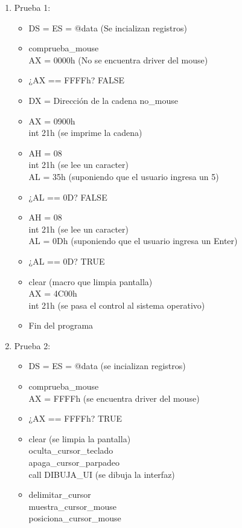 \documentclass[12pt]{article}
\begin{document}
\begin{enumerate}
    \item Prueba 1:
    \begin{itemize}
    \item DS = ES = @data (Se incializan registros)
    \item comprueba\_mouse \\ AX = 0000h (No se encuentra driver del mouse)
    \item ¿AX == FFFFh? FALSE
    \item DX = Dirección de la cadena no\_mouse
    \item AX = 0900h \\ int 21h (se imprime la cadena)
    \item AH = 08 \\ int 21h (se lee un caracter) \\AL = 35h (suponiendo que el usuario ingresa un 5)
    \item ¿AL == 0D? FALSE
    \item AH = 08 \\ int 21h (se lee un caracter) \\AL = 0Dh (suponiendo que el usuario ingresa un Enter)
    \item ¿AL == 0D? TRUE
    \item clear (macro que limpia pantalla) \\ AX = 4C00h \\int 21h (se pasa el control al sistema operativo)
    \item Fin del programa
\end{itemize}
    \item Prueba 2:
    \begin{itemize}
        \item DS = ES = @data (se incializan registros)
        \item comprueba\_mouse \\ AX = FFFFh (se encuentra driver del mouse)
        \item ¿AX == FFFFh? TRUE
        \item clear (se limpia la pantalla) \\ oculta\_cursor\_teclado \\ apaga\_cursor\_parpadeo \\ call DIBUJA\_UI (se dibuja la interfaz)
        \item delimitar\_cursor \\ muestra\_cursor\_mouse \\ posiciona\_cursor\_mouse

\end{itemize}
\end{enumerate}
\end{document}
